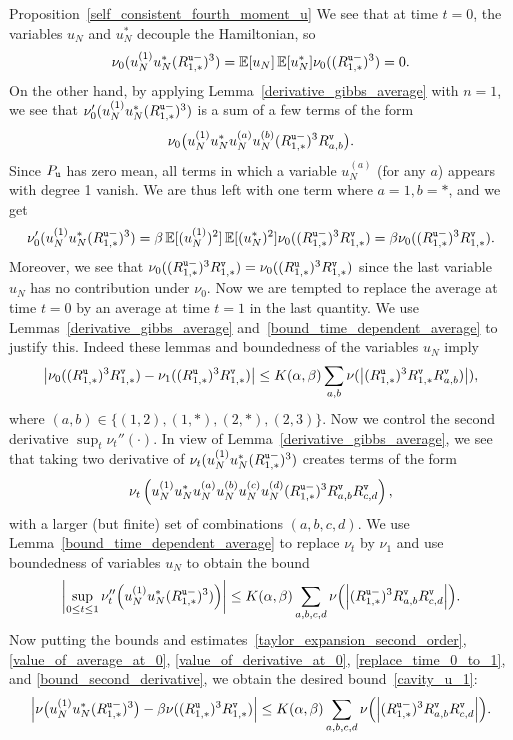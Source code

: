 \documentclass[final,12pt]{colt2018} %
\newcommand{\utt}{\textup{\texttt{u}}}
\newcommand{\vtt}{\textup{\texttt{v}}}
\begin{document}
\begin{proofof}{Proposition~\ref{self_consistent_fourth_moment_u}}
We see that at time $t=0$, the variables $u_N$ and $u_N^*$ decouple the Hamiltonian, so  
\begin{equation}\label{value_of_average_at_0}
\nu_0(u^{(1)}_{N}u^{*}_{N}(R^{\utt-}_{1,*})^3) = \E[u_N]\E[u^*_N]  \nu_0((R^{\utt-}_{1,*})^3) = 0.
\end{equation}
On the other hand, by applying Lemma~\ref{derivative_gibbs_average} with $n=1$, we see that $\nu_0'(u^{(1)}_{N}u^{*}_{N}(R^{\utt-}_{1,*})^3)$ is a sum of a few terms of the form
\[\nu_0\big(u^{(1)}_{N}u^{*}_{N}u^{(a)}_{N}u^{(b)}_{N}(R^{\utt-}_{1,*})^3R^{\vtt}_{a,b}\big).\]
Since $P_{\utt}$ has zero mean, all terms in which a variable $u_N^{(a)}$ (for any $a$) appears with degree 1 vanish. We are thus left with one term where $a=1,b=*$, and we get 
\begin{equation}\label{value_of_derivative_at_0}
\nu_0'(u^{(1)}_{N}u^{*}_{N}(R^{\utt-}_{1,*})^3) = \beta\E[(u_N^{(1)})^2]\E[(u_N^{*})^2]  \nu_0((R^{\utt-}_{1,*})^3R^{\vtt}_{1,*}) = \beta\nu_0((R^{\utt-}_{1,*})^3R^{\vtt}_{1,*}).
\end{equation}
Moreover, we see that $\nu_0((R^{\utt-}_{1,*})^3R^{\vtt}_{1,*}) = \nu_0((R^{\utt}_{1,*})^3R^{\vtt}_{1,*})$ since the last variable $u_N$ has no contribution under $\nu_0$. Now we are tempted to replace the average at time $t=0$ by an average at time $t=1$ in the last quantity.
We use Lemmas~\ref{derivative_gibbs_average} and~\ref{bound_time_dependent_average} to justify this. Indeed these lemmas and boundedness of the variables $u_N$ imply
\begin{equation}\label{replace_time_0_to_1}
\abs{\nu_0((R^{\utt}_{1,*})^3R^{\vtt}_{1,*}) - \nu_1((R^{\utt}_{1,*})^3R^{\vtt}_{1,*})} \le  K(\alpha,\beta)\sum_{a,b}\nu(\abs{(R^{\utt}_{1,*})^3R^{\vtt}_{1,*}R^{\vtt}_{a,b})}),
\end{equation}
where $(a,b) \in \{(1,2),(1,*),(2,*),(2,3)\}$. Now we control the second derivative $\sup_t\nu_t''(\cdot)$. In view of Lemma~\ref{derivative_gibbs_average}, we see that taking two derivative of $\nu_t(u^{(1)}_{N}u^{*}_{N}(R^{\utt-}_{1,*})^3)$ creates terms of the form
\[\nu_t\left(u^{(1)}_{N}u^{*}_{N}u^{(a)}_{N}u^{(b)}_{N}u^{(c)}_{N}u^{(d)}_{N}(R^{\utt-}_{1,*})^3R^{\vtt}_{a,b}R^{\vtt}_{c,d}\right),\]
with a larger (but finite) set of combinations $(a,b,c,d)$.
We use Lemma~\ref{bound_time_dependent_average} to replace $\nu_t$ by $\nu_1$ and use boundedness of variables $u_N$ to obtain the bound
\begin{equation}\label{bound_second_derivative}
\abs{\sup_{0 \le t\le 1} \nu_t''\Big(u^{(1)}_{N}u^{*}_{N}(R^{\utt-}_{1,*})^3)\Big)} \le K(\alpha,\beta)\sum_{a,b,c,d} \nu\Big(\Big|(R^{\utt-}_{1,*})^3R^{\vtt}_{a,b}R^{\vtt}_{c,d}\Big|\Big).
\end{equation}
Now putting the bounds and estimates~\eqref{taylor_expansion_second_order}, \eqref{value_of_average_at_0}, \eqref{value_of_derivative_at_0}, \eqref{replace_time_0_to_1}, and \eqref{bound_second_derivative}, we obtain the desired bound~\eqref{cavity_u_1}:
\[\abs{\nu\big(u^{(1)}_{N}u^{*}_{N}(R^{\utt-}_{1,*})^3\big) - \beta \nu((R^{\utt}_{1,*})^3R^{\vtt}_{1,*})} \le K(\alpha,\beta)\sum_{a,b,c,d} \nu\Big(\Big|(R^{\utt-}_{1,*})^3R^{\vtt}_{a,b}R^{\vtt}_{c,d}\Big|\Big).\] 


\end{proofof}
\end{document}

